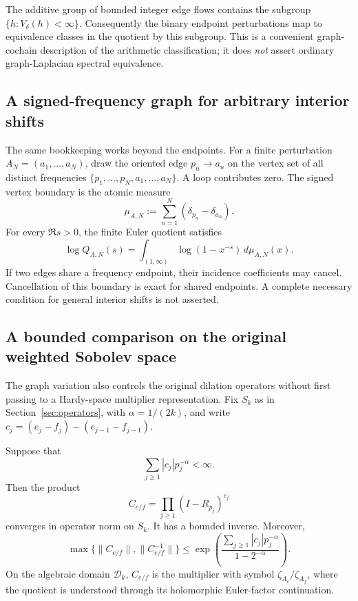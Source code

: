 The additive group of bounded integer edge flows contains the subgroup
\(\{h:V_\delta(h)<\infty\}\).
Consequently the binary endpoint perturbations map to equivalence
classes in the quotient by this subgroup.  This is a convenient
graph-cochain description of the arithmetic classification; it does
\emph{not} assert ordinary graph-Laplacian spectral equivalence.

\subsection{A signed-frequency graph for arbitrary interior shifts}

The same bookkeeping works beyond the endpoints.  For a finite
perturbation \(A_N=(a_1,\ldots,a_N)\), draw the oriented edge
\(p_n\to a_n\) on the vertex set of all distinct frequencies
\(\{p_1,\ldots,p_N,a_1,\ldots,a_N\}\).  A loop contributes zero.
The signed vertex boundary is the atomic measure
\[
 \mu_{A,N}:=\sum_{n=1}^N(\delta_{p_n}-\delta_{a_n}).
\]
For every \(\Re s>0\), the finite Euler quotient satisfies
\begin{equation}\label{eq:graph-atomic}
 \log Q_{A,N}(s)=
 \int_{(1,\infty)}\log(1-x^{-s})\,d\mu_{A,N}(x).
\end{equation}
If two edges share a frequency endpoint, their incidence
coefficients may cancel.  Cancellation of this boundary is exact for shared endpoints. A complete
necessary condition for general interior shifts is not asserted.


\subsection{A bounded comparison on the original weighted Sobolev space}

The graph variation also controls the original dilation operators
without first passing to a Hardy-space multiplier representation.
Fix $S_k$ as in Section~\ref{sec:operators}, with
$\alpha=1/(2k)$, and write
$c_j=(e_j-f_j)-(e_{j-1}-f_{j-1})$.

\begin{theorem}
\label{thm:graph-Sk}
Suppose that
\begin{equation}\label{eq:graph-Sk-hyp}
 \sum_{j\ge1}|c_j|p_j^{-\alpha}<\infty.
\end{equation}
Then the product
\begin{equation}\label{eq:graph-Sk-operator}
 C_{e/f}=\prod_{j\ge1}(I-R_{p_j})^{c_j}
\end{equation}
converges in operator norm on $S_k$. It has a bounded inverse.
Moreover,
\begin{equation}\label{eq:graph-Sk-bound}
 \max\{\|C_{e/f}\|,\|C_{e/f}^{-1}\|\}
 \le \exp\left(
 \frac{\sum_{j\ge1}|c_j|p_j^{-\alpha}}
 {1-2^{-\alpha}}\right).
\end{equation}
On the algebraic domain $\mathcal D_k$, $C_{e/f}$ is the
multiplier with symbol $\zeta_{A_e}/\zeta_{A_f}$,
where the quotient is understood through its holomorphic
Euler-factor continuation.
\end{theorem}

